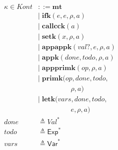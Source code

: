\documentclass[12pt,draft]{article}
\begin{document}
{\begin{multicols*}{2}
\begin{center}
\begin{align*}
\kappa \in \textit{Kont} &::= \textbf{mt} \\
        &|\; \textbf{ifk}(e, e, \rho, a) \\
        &|\; \textbf{callcck}(a) \\
        &|\; \textbf{setk}(x, \rho, a) \\
        &|\; \textbf{appappk}(val?, e, \rho, a) \\
        &|\; \textbf{appk}(done, todo, \rho, a) \\
        &|\; \textbf{appprimk}(op, \rho, a) \\
        &|\; \textbf{primk}(op, done, todo, \\
        &\;\;\;\;\;\;\;\;\;\;\;\;\;\;\;\;\;\rho, a) \\
        &|\; \textbf{letk}(vars, done, todo, \\
        &\;\;\;\;\;\;\;\;\;\;\;\;\;\;\;\;\;e, \rho, a) \\
done &\triangleq \textit{Val}^\ast \\
todo &\triangleq \textsf{Exp}^* \\
vars &\triangleq \textsf{Var}^*
\end{align*}
\end{center}
\end{multicols*}
}
\end{document}

